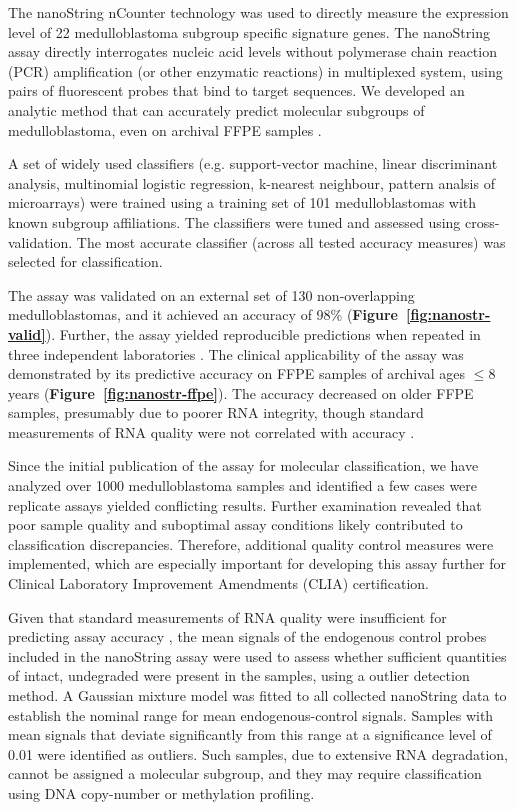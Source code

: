 \documentclass[11pt,letterpaper]{article}
\theoremstyle{definition}
\begin{document}
The nanoString nCounter technology  was used to directly measure the expression level of 22 medulloblastoma subgroup specific signature genes. The nanoString assay directly interrogates nucleic acid levels without polymerase chain reaction (PCR) amplification (or other enzymatic reactions) in multiplexed system, using pairs of fluorescent probes that bind to target sequences. We developed an analytic method that can accurately predict molecular subgroups of medulloblastoma, even on archival FFPE samples .

A set of widely used classifiers (e.g. support-vector machine, linear discriminant analysis, multinomial logistic regression, k-nearest neighbour, pattern analsis of microarrays) were trained using a training set of 101 medulloblastomas with known subgroup affiliations. The classifiers were tuned and assessed using cross-validation. The most accurate classifier (across all tested accuracy measures) was selected for classification.

The assay was validated on an external set of 130 non-overlapping medulloblastomas, and it achieved an accuracy of 98\% (\textbf{Figure~\ref{fig:nanostr-valid}}). Further, the assay yielded reproducible predictions when repeated in three independent laboratories . The clinical applicability of the assay was demonstrated by its predictive accuracy on FFPE samples of archival ages $\leq 8$ years (\textbf{Figure~\ref{fig:nanostr-ffpe}}). The accuracy decreased on older FFPE samples, presumably due to poorer RNA integrity, though standard measurements of RNA quality were not correlated with accuracy .

Since the initial publication of the assay for molecular classification, we have analyzed over 1000 medulloblastoma samples and identified a few cases were replicate assays yielded conflicting results. Further examination revealed that poor sample quality and suboptimal assay conditions likely contributed to classification discrepancies. Therefore, additional quality control measures were implemented, which are especially important for developing this assay further for Clinical Laboratory Improvement Amendments (CLIA) certification.

Given that standard measurements of RNA quality were insufficient for predicting assay accuracy , the mean signals of the endogenous control probes included in the nanoString assay were used to assess whether sufficient quantities of intact, undegraded were present in the samples, using a outlier detection method. A Gaussian mixture model was fitted to all collected nanoString data to establish the nominal range for mean endogenous-control signals. Samples with mean signals that deviate significantly from this range at a significance level of 0.01 were identified as outliers. Such samples, due to extensive RNA degradation, cannot be assigned a molecular subgroup, and they may require classification using DNA copy-number or methylation profiling.
\end{document}
